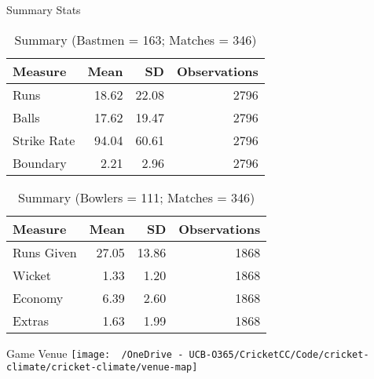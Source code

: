 \documentclass[
  10pt,
  ignorenonframetext,
  twocolumn]{beamer}
\begin{document}
\begin{frame}{Summary Stats}
\protect\hypertarget{summary-stats}{}
\small

\begin{table}

\caption{\label{tab:unnamed-chunk-2}Summary (Bastmen = 163; Matches = 346)}
\centering
\begin{tabular}[t]{l|r|r|r}
\hline
Measure & Mean & SD & Observations\\
\hline
Runs & 18.62 & 22.08 & 2796\\
\hline
Balls & 17.62 & 19.47 & 2796\\
\hline
Strike Rate & 94.04 & 60.61 & 2796\\
\hline
Boundary & 2.21 & 2.96 & 2796\\
\hline
\end{tabular}
\end{table}

\begin{table}

\caption{\label{tab:unnamed-chunk-2}Summary (Bowlers = 111; Matches = 346)}
\centering
\begin{tabular}[t]{l|r|r|r}
\hline
Measure & Mean & SD & Observations\\
\hline
Runs Given & 27.05 & 13.86 & 1868\\
\hline
Wicket & 1.33 & 1.20 & 1868\\
\hline
Economy & 6.39 & 2.60 & 1868\\
\hline
Extras & 1.63 & 1.99 & 1868\\
\hline
\end{tabular}
\end{table}
\end{frame}

\begin{frame}{Game Venue}
\protect\hypertarget{game-venue}{}
\texttt{[image: ~/OneDrive - UCB-O365/CricketCC/Code/cricket-climate/cricket-climate/venue-map]}
\end{frame}
\end{document}

